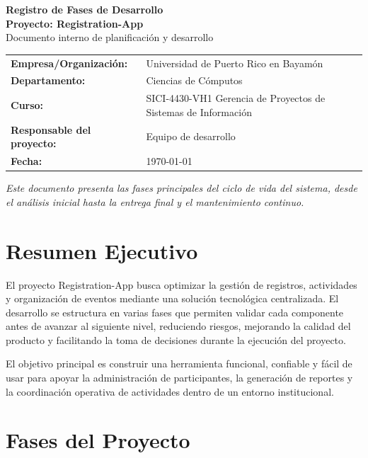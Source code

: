 \documentclass[11pt,a4paper]{article}
\begin{document}
	
	\begin{titlepage}
		\centering
		\vspace*{2cm}
		{\fontsize{22}{26}\selectfont\bfseries\color{companyblue} Registro de Fases de Desarrollo}\\[0.8cm]
		{\Large\bfseries Proyecto: Registration-App}\\[0.5cm]
		{\large Documento interno de planificación y desarrollo}\\[2cm]
		
		\begin{tabular}{>{\bfseries}p{} p{}}
			Empresa/Organización: & Universidad de Puerto Rico en Bayamón \\
			Departamento: & Ciencias de Cómputos \\
			Curso: & SICI-4430-VH1 Gerencia de Proyectos de Sistemas de Información \\
			Responsable del proyecto: & Equipo de desarrollo \\
			Fecha: & \today
		\end{tabular}
		
		\vfill
		\begin{flushleft}
			\small\textit{Este documento presenta las fases principales del ciclo de vida del sistema, desde el análisis inicial hasta la entrega final y el mantenimiento continuo.}
		\end{flushleft}
	\end{titlepage}
	
	\tableofcontents
	\clearpage
	
	\section{Resumen Ejecutivo}
	El proyecto Registration-App busca optimizar la gestión de registros, actividades y organización de eventos mediante una solución tecnológica centralizada. El desarrollo se estructura en varias fases que permiten validar cada componente antes de avanzar al siguiente nivel, reduciendo riesgos, mejorando la calidad del producto y facilitando la toma de decisiones durante la ejecución del proyecto.
	
	El objetivo principal es construir una herramienta funcional, confiable y fácil de usar para apoyar la administración de participantes, la generación de reportes y la coordinación operativa de actividades dentro de un entorno institucional.
	
	\section{Fases del Proyecto}
	
\end{document}
